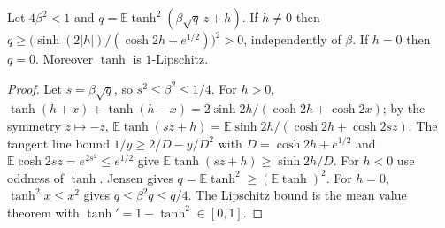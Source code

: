 \begin{lemma}
\label{lem:sg-tal:fixed-point-lower}
  \leanok
{}
Let $4\beta^2<1$ and $q=\mathbb E\tanh^2(\beta\sqrt q\,z+h)$.  If $h\ne0$ then $q\ge\bigl(\sinh(2|h|)/(\cosh2h+e^{1/2})\bigr)^2>0$, independently of $\beta$.  If $h=0$ then $q=0$.  Moreover $\tanh$ is $1$-Lipschitz.
\end{lemma}
\begin{proof}
  \leanok
Let $s=\beta\sqrt q$, so $s^2\le\beta^2\le1/4$.  For $h>0$, $\tanh(h+x)+\tanh(h-x)=2\sinh2h/(\cosh2h+\cosh2x)$; by the symmetry $z\mapsto-z$, $\mathbb E\tanh(sz+h)=\mathbb E\sinh2h/(\cosh2h+\cosh2sz)$.  The tangent line bound $1/y\ge2/D-y/D^2$ with $D=\cosh2h+e^{1/2}$ and $\mathbb E\cosh2sz=e^{2s^2}\le e^{1/2}$ give $\mathbb E\tanh(sz+h)\ge\sinh2h/D$.  For $h<0$ use oddness of $\tanh$.  Jensen gives $q=\mathbb E\tanh^2\ge(\mathbb E\tanh)^2$.  For $h=0$, $\tanh^2x\le x^2$ gives $q\le\beta^2q\le q/4$.  The Lipschitz bound is the mean value theorem with $\tanh'=1-\tanh^2\in[0,1]$.
\end{proof}

